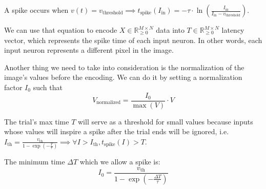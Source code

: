 A spike occurs when $v(t) = v_{\text{threshold}} \implies t_{\text{spike}}(I_{\text{in}}) = -\tau \cdot \ln\left(\frac{I_{\text{in}}}{I_{\text{in}} - v_{\text{threshold}}}\right)$.

We can use that equation to encode $X \in \mathbb{R}_{\geq 0}^{M \times N}$ data into $T \in \mathbb{R}_{\geq 0}^{M \times N}$ latency vector, which represents the spike time of each input neuron. In other words, each input neuron represents a different pixel in the image.

Another thing we need to take into consideration is the normalization of the image's values before the encoding. We can do it by setting a normalization factor $I_0$ such that 
\begin{equation}
V_{\text{normalized}} = \frac{I_0}{\max(V)} \cdot V
\end{equation}

The trial's max time $T$ will serve as a threshold for small values because inputs whose values will inspire a spike after the trial ends will be ignored, i.e. $I_{\text{th}} = \frac{v_{\text{th}}}{1 - \exp\left(-\frac{T}{\tau}\right)} \implies \forall I > I_{\text{th}}, t_{\text{spike}}(I) > T$.

The minimum time $\Delta T$ which we allow a spike is:
\begin{equation}
I_0 = \frac{v_{\text{th}}}{1 - \exp\left(-\frac{\Delta T}{\tau}\right)}
\end{equation}